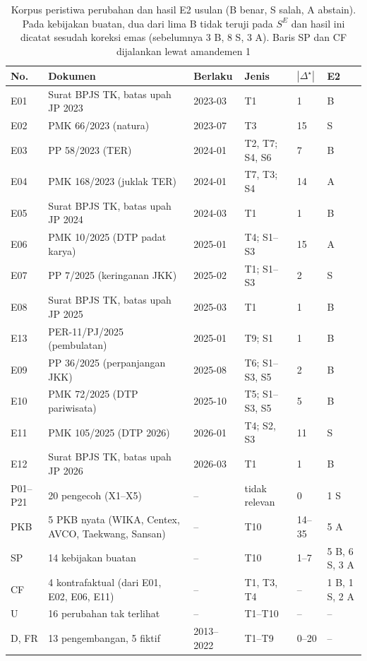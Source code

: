 \documentclass[journal,a4paper]{IEEEtran}
\makeatletter
\DeclareRobustCommand{\en}[1]{{\usefont{\f@encoding}{\f@family}{\f@series}{it}#1\/}}
\newcommand{\emas}{\star}
\newcommand{\SE}{S^{E}}
\makeatother
\begin{document}
\begin{table}[t]
\centering
\caption{Korpus peristiwa perubahan dan hasil E2 usulan (B benar, S salah, A \en{abstain}). Pada kebijakan buatan, dua dari lima B tidak teruji pada $\SE$ dan hasil ini dicatat sesudah koreksi emas (sebelumnya 3 B, 8 S, 3 A). Baris SP dan CF dijalankan lewat amandemen 1}
\label{tab:korpus}
\scriptsize
\setlength{\tabcolsep}{3pt}
\begin{tabularx}{\columnwidth}{@{}P{0.55cm} L P{1.0cm} P{1.1cm} P{0.55cm} P{0.75cm}@{}}
\toprule
\textbf{No.} & \textbf{Dokumen} & \textbf{Berlaku} & \textbf{Jenis} & $|\Delta^{\emas}|$ & \textbf{E2} \\
\midrule
E01 & Surat BPJS TK, batas upah JP 2023 & 2023-03 & T1 & 1 & B \\
E02 & PMK 66/2023 (natura) & 2023-07 & T3 & 15 & S \\
E03 & PP 58/2023 (TER) & 2024-01 & T2, T7; S4, S6 & 7 & B \\
E04 & PMK 168/2023 (juklak TER) & 2024-01 & T7, T3; S4 & 14 & A \\
E05 & Surat BPJS TK, batas upah JP 2024 & 2024-03 & T1 & 1 & B \\
E06 & PMK 10/2025 (DTP padat karya) & 2025-01 & T4; S1--S3 & 15 & A \\
E07 & PP 7/2025 (keringanan JKK) & 2025-02 & T1; S1--S3 & 2 & S \\
E08 & Surat BPJS TK, batas upah JP 2025 & 2025-03 & T1 & 1 & B \\
E13 & PER-11/PJ/2025 (pembulatan) & 2025-01 & T9; S1 & 1 & B \\
E09 & PP 36/2025 (perpanjangan JKK) & 2025-08 & T6; S1--S3, S5 & 2 & B \\
E10 & PMK 72/2025 (DTP pariwisata) & 2025-10 & T5; S1--S3, S5 & 5 & B \\
E11 & PMK 105/2025 (DTP 2026) & 2026-01 & T4; S2, S3 & 11 & S \\
E12 & Surat BPJS TK, batas upah JP 2026 & 2026-03 & T1 & 1 & B \\
\midrule
P01--P21 & 20 pengecoh (X1--X5) & -- & tidak relevan & 0 & 1 S \\
PKB & 5 PKB nyata (WIKA, Centex, AVCO, Taekwang, Sansan) & -- & T10 & 14--35 & 5 A \\
SP & 14 kebijakan buatan & -- & T10 & 1--7 & 5 B, 6 S, 3 A \\
CF & 4 kontrafaktual (dari E01, E02, E06, E11) & -- & T1, T3, T4 & -- & 1 B, 1 S, 2 A \\
U & 16 perubahan tak terlihat & -- & T1--T10 & -- & -- \\
D, FR & 13 pengembangan, 5 fiktif & 2013--2022 & T1--T9 & 0--20 & -- \\
\bottomrule
\end{tabularx}
\end{table}
\end{document}
